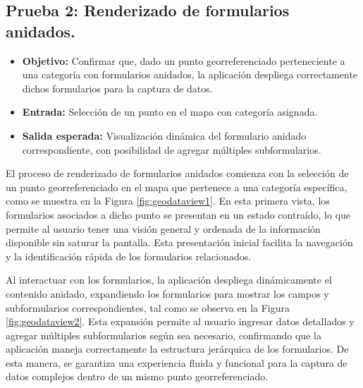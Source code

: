 \documentclass{article}
\begin{document}
\subsection{Prueba 2: Renderizado de formularios anidados.}
\begin{itemize}
  \item \textbf{Objetivo:} Confirmar que, dado un punto georreferenciado perteneciente a una categoría con formularios anidados, la aplicación despliega correctamente dichos formularios para la captura de datos.
  \item \textbf{Entrada:} Selección de un punto en el mapa con categoría asignada.
  \item \textbf{Salida esperada:} Visualización dinámica del formulario anidado correspondiente, con posibilidad de agregar múltiples subformularios.
\end{itemize}

El proceso de renderizado de formularios anidados comienza con la selección de un punto georreferenciado en el mapa que pertenece a una categoría específica, como se muestra en la Figura \ref{fig:geodataview1}. En esta primera vista, los formularios asociados a dicho punto se presentan en un estado contraído, lo que permite al usuario tener una visión general y ordenada de la información disponible sin saturar la pantalla. Esta presentación inicial facilita la navegación y la identificación rápida de los formularios relacionados.

Al interactuar con los formularios, la aplicación despliega dinámicamente el contenido anidado, expandiendo los formularios para mostrar los campos y subformularios correspondientes, tal como se observa en la Figura \ref{fig:geodataview2}. Esta expansión permite al usuario ingresar datos detallados y agregar múltiples subformularios según sea necesario, confirmando que la aplicación maneja correctamente la estructura jerárquica de los formularios. De esta manera, se garantiza una experiencia fluida y funcional para la captura de datos complejos dentro de un mismo punto georreferenciado.
\end{document}

